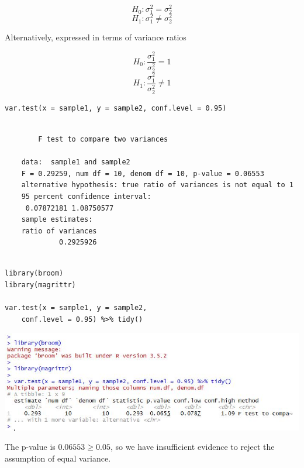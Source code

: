 \documentclass[a4paper,12pt]{article}
\begin{document}
$$ H_0 : \sigma^2_{1} = \sigma^2_{2} $$
$$ H_1 : \sigma^2_{1} \neq \sigma^2_{2} $$


\noindent Alternatively, expressed in terms of variance ratios

$$ H_0 : \frac{\sigma^2_{1}}{ \sigma^2_{2} } = 1$$
$$ H_1 : \frac{\sigma^2_{1}}{ \sigma^2_{2} } \neq 1 $$

\newpage 

\begin{framed}\begin{verbatim}
var.test(x = sample1, y = sample2, conf.level = 0.95)

\end{verbatim}\end{framed}


\begin{verbatim}
  
    	F test to compare two variances
    
    data:  sample1 and sample2
    F = 0.29259, num df = 10, denom df = 10, p-value = 0.06553
    alternative hypothesis: true ratio of variances is not equal to 1
    95 percent confidence interval:
     0.07872181 1.08750577
    sample estimates:
    ratio of variances 
             0.2925926 
    
\end{verbatim} 


\newpage 
\begin{framed}\begin{verbatim}
library(broom)
library(magrittr)

var.test(x = sample1, y = sample2, 
    conf.level = 0.95) %>% tidy() 
\end{verbatim}\end{framed}

    \includegraphics[scale=1.15]{00-A1/images/A1-Q4-Broom.JPG}

\medskip
\noindent The p-value is $0.06553 \geq 0.05$, so we have insufficient evidence to reject the assumption of
equal variance.


\newpage 
\end{document}
